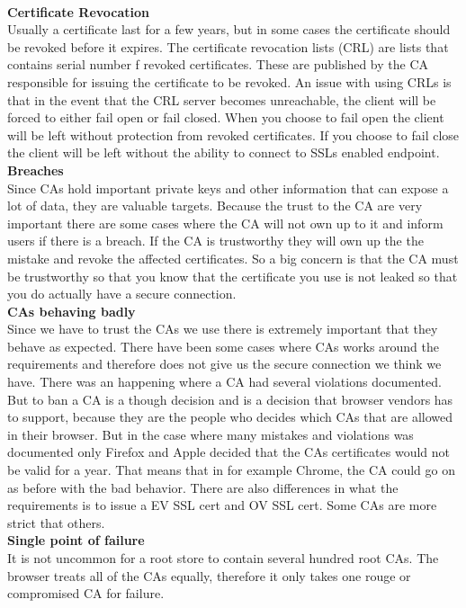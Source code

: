 \documentclass[12pt, letterpaper]{article}
\begin{document}
\\
\textbf{Certificate Revocation}
\\
Usually a certificate last for a few years, but in some cases the certificate should be revoked before it expires. The certificate revocation lists (CRL) are lists that contains serial number f revoked certificates. These are published by the CA responsible for issuing the certificate to be revoked. An issue with using CRLs is that in the event that the CRL server becomes unreachable, the client will be forced to either fail open or fail closed. When you choose to fail open the client will be left without protection from revoked certificates. If you choose to fail close the client will be left without the ability to connect to SSLs enabled endpoint.
\\
\textbf{Breaches}
\\
Since CAs hold important private keys and other information that can expose a lot of data, they are valuable targets. Because the trust to the CA are very important there are some cases where the CA will not own up to it and inform users if there is a breach. If the CA is trustworthy they will own up the the mistake and revoke the affected certificates. So a big concern is that the CA must be trustworthy so that you know that the certificate you use is not leaked so that you do actually have a secure connection.
\\
\textbf{CAs behaving badly}
\\
Since we have to trust the CAs we use there is extremely important that they behave as expected. There have been some cases where CAs works around the requirements and therefore does not give us the secure connection we think we have. There was an happening where a CA had several violations documented. But to ban a CA is a though decision and is a decision that browser vendors has to support, because they are the people who decides which CAs that are allowed in their browser. But in the case where many mistakes and violations was documented only Firefox and Apple decided that the CAs certificates would not be valid for a year. That means that in for example Chrome, the CA could go on as before with the bad behavior. There are also differences in what the requirements is to issue a EV SSL cert and OV SSL cert. Some CAs are more strict that others.
\\
\textbf{Single point of failure}
\\
It is not uncommon for a root store to contain several hundred root CAs. The browser treats all of the CAs equally, therefore it only takes one rouge or compromised CA for failure.
\end{document}
